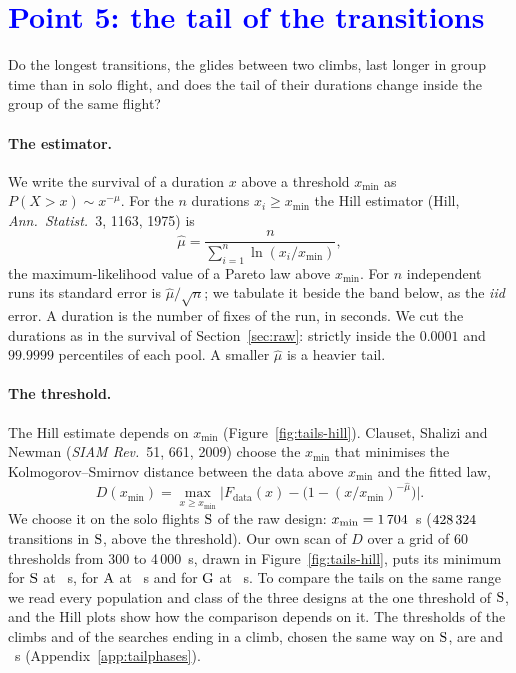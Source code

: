 \section{\texorpdfstring{\textcolor{blue}{Point 5: the tail of the transitions}}{Point 5: the tail of the transitions}}\label{sec:tails}

Do the longest transitions, the glides between two climbs, last longer in group time than in solo flight, and does the tail of their durations change inside the group of the same flight?

\paragraph{The estimator.} We write the survival of a duration $x$ above a threshold $x_{\min}$ as $P(X>x)\sim x^{-\mu}$. For the $n$ durations $x_i\ge x_{\min}$ the Hill estimator (Hill, \emph{Ann.\ Statist.}\ 3, 1163, 1975) is
\[
  \hat\mu=\frac{n}{\sum_{i=1}^{n}\ln\!\left(x_i/x_{\min}\right)},
\]
the maximum-likelihood value of a Pareto law above $x_{\min}$. For $n$ independent runs its standard error is $\hat\mu/\sqrt n$; we tabulate it beside the band below, as the \emph{iid} error. A duration is the number of fixes of the run, in seconds. We cut the durations as in the survival of Section~\ref{sec:raw}: strictly inside the $0.0001$ and $99.9999$ percentiles of each pool. A smaller $\hat\mu$ is a heavier tail.

\paragraph{The threshold.} The Hill estimate depends on $x_{\min}$ (Figure~\ref{fig:tails-hill}). Clauset, Shalizi and Newman (\emph{SIAM Rev.}\ 51, 661, 2009) choose the $x_{\min}$ that minimises the Kolmogorov--Smirnov distance between the data above $x_{\min}$ and the fitted law,
\[
  D(x_{\min})=\max_{x\ge x_{\min}}\bigl|F_\text{data}(x)-\bigl(1-(x/x_{\min})^{-\hat\mu}\bigr)\bigr|.
\]
We choose it on the solo flights $\mathrm{S}$ of the raw design: $x_{\min}=1\,704$~s ($428\,324$ transitions in $\mathrm{S}$, \TlRawMuSN{} above the threshold). Our own scan of $D$ over a grid of $60$ thresholds from 300 to 4\,000~s, drawn in Figure~\ref{fig:tails-hill}, puts its minimum for $\mathrm{S}$ at \TlKsXminS~s, for $\mathrm{A}$ at \TlKsXminA~s and for $\mathrm{G}$ at \TlKsXminG~s. To compare the tails on the same range we read every population and class of the three designs at the one threshold of $\mathrm{S}$, and the Hill plots show how the comparison depends on it. The thresholds of the climbs and of the searches ending in a climb, chosen the same way on $\mathrm{S}$, are \TlXminClimb{} and \TlXminSearch~s (Appendix~\ref{app:tailphases}).

